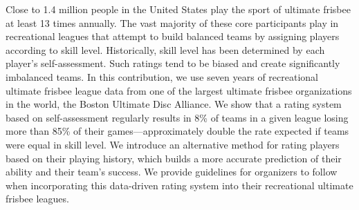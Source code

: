 Close to 1.4 million people in the United States play the sport of ultimate frisbee at least 13 times annually. The vast majority of these core participants play in recreational leagues that attempt to build balanced teams by assigning players according to skill level. Historically, skill level has been determined by each player’s self-assessment. Such ratings tend to be biased and create significantly imbalanced teams. In this contribution, we use seven years of recreational ultimate frisbee league data from one of the largest ultimate frisbee organizations in the world, the Boston Ultimate Disc Alliance. We show that a rating system based on self-assessment regularly results in 8\% of teams in a given league losing more than 85\% of their games---approximately double the rate expected if teams were equal in skill level. We introduce an alternative method for rating players based on their playing history, which builds a more accurate prediction of their ability and their team’s success. We provide guidelines for organizers to follow when incorporating this data-driven rating system into their recreational ultimate frisbee leagues.